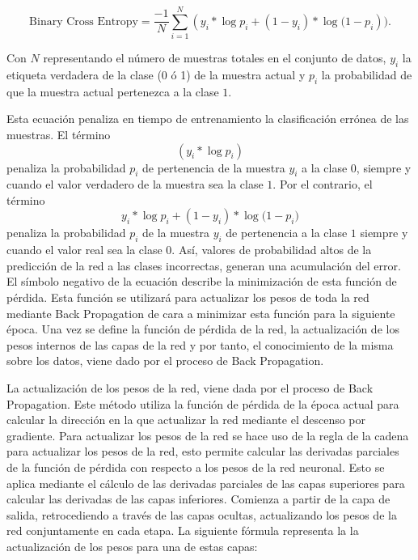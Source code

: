 \documentclass{uathesis-es}
\begin{document}
$$\text{Binary Cross Entropy} = \frac{-1}{N} \sum_{i=1}^{N} (y_{i}*\log{p_{i}}+ (1 - y_{i})*\log{(1-p_{i}})).$$

Con $N$ representando el número de muestras totales en el conjunto de datos, $y_i$ la etiqueta verdadera de la clase (0 ó 1) de la muestra actual y $p_i$ la probabilidad de que la muestra actual pertenezca a la clase $1$.

Esta ecuación penaliza en tiempo de entrenamiento la clasificación errónea de las muestras. El término $$(y_{i}*\log p_{i})$$ penaliza la probabilidad $p_i$ de pertenencia de la muestra $y_i$ a la clase $0$, siempre y cuando el valor verdadero de la muestra sea la clase $1$. Por el contrario, el término 
$$y_{i}*\log{p_{i}}+ (1 - y_{i})*\log{(1-p_{i}})$$
penaliza la probabilidad $p_i$ de la muestra $y_i$ de pertenencia a la clase $1$ siempre y cuando el valor real sea la clase $0$. Así, valores de probabilidad altos de la predicción de la red a las clases incorrectas, generan una acumulación del error. El símbolo negativo de la ecuación describe la minimización de esta función de pérdida. Esta función se utilizará para actualizar los pesos de toda la red mediante Back Propagation de cara a minimizar esta función para la siguiente época. Una vez se define la función de pérdida de la red, la actualización de los pesos internos de las capas de la red y por tanto, el conocimiento de la misma sobre los datos, viene dado por el proceso de Back Propagation.





La actualización de los pesos de la red, viene dada por el proceso de Back Propagation. Este método utiliza la función de pérdida de la época actual para calcular la dirección en la que actualizar la red mediante el descenso por gradiente. Para actualizar los pesos de la red se hace uso de la regla de la cadena para actualizar los pesos de la red, esto permite calcular las derivadas parciales de la función de pérdida con respecto a los pesos de la red neuronal. Esto se aplica mediante el cálculo de las derivadas parciales de las capas superiores para calcular las derivadas de las capas inferiores. Comienza a partir de la capa de salida, retrocediendo a través de las capas ocultas, actualizando los pesos de la red conjuntamente en cada etapa. La siguiente fórmula representa la la actualización de los pesos para una de estas capas:
\end{document}
